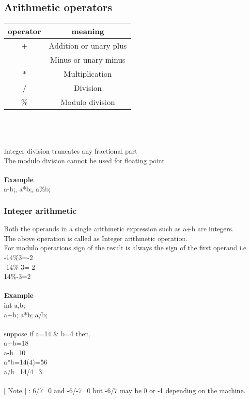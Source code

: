 \documentclass{article}
\begin{document}
	\subsection{Arithmetic operators}
	\begin{tabular}{|c|c|}
		\hline
		operator & meaning \\
		\hline
		+ & Addition or unary plus \\
		- & Minus or unary minus \\
		* & Multiplication \\
		/ & Division \\
		\% & Modulo division \\
		\hline
	\end{tabular} \\ \\ \\
	Integer division truncates any fractional part \\ 
	The modulo division cannot be used for floating point
	\\ \\
	\textbf{Example} \\
	a-b;, a*b;, a\%b;
	
	\newpage
	
	\subsubsection{Integer arithmetic}
	Both the operands in a single arithmetic expression such as a+b are integers. \\
	The above operation is called as Integer arithmetic operation. \\	
	For modulo operations sign of the result is always the sign of the first operand i.e \\
	-14\%3=-2 \\
	-14\%-3=-2 \\
	14\%-3=2
	\\ \\
	\textbf{Example} \\
	int a,b; \\ a+b; a*b; a/b; \\ \\
	suppose if a=14 \& b=4 then, \\ a+b=18 \\a-b=10 \\ a*b=14(4)=56 \\ a/b=14/4=3
	\\ \\
	$[$ Note $]$ : 6/7=0 and -6/-7=0 but -6/7 may be 0 or -1 depending on the machine.
	
\end{document}
